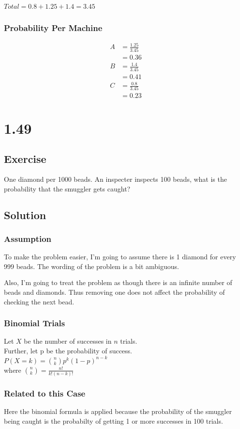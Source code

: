 \documentclass[12pt]{article}
\begin{document}
$Total=0.8+1.25+1.4=3.45$
\subsubsection{Probability Per Machine}
\begin{align*}
A&=\frac{1.25}{3.45}\\ 
&=0.36\\
B&=\frac{1.4}{3.45}\\ 
&=0.41\\
C&=\frac{0.8}{3.45}\\
&=0.23
\end{align*}  

\section{1.49}
\subsection{Exercise}
One diamond per 1000 beads. An inspecter inspects 100 beads, what is the 
probability that the smuggler gets caught?

\subsection{Solution}
\subsubsection{Assumption}
To make the problem easier, I'm going to assume there is 1 diamond for 
every 999 beads. The wording of the problem is a bit ambiguous.

Also, I'm going to treat the problem as though there is an infinite number of 
beads and diamonds. Thus removing one does not affect the probability of 
checking the next bead.

\subsubsection{Binomial Trials}
Let $X$ be the number of successes in $n$ trials.\\
Further, let p be the probability of success.\\
$P(X=k)=\binom{n}{k}p^k(1-p)^{n-k}$ \\
where $\binom{n}{k} = \frac{n!}{k!(n-k)!}$

\subsubsection{Related to this Case}
Here the binomial formula is applied because the probability of the smuggler being caught is the 
probabilty of getting 1 or more successes in 100 trials.
\end{document}

